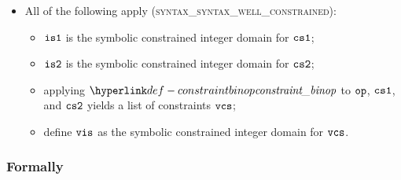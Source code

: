 \begin{itemize}
  \item All of the following apply (\textsc{syntax\_syntax\_well\_constrained}):
  \begin{itemize}
    \item $\visone$ is the symbolic constrained integer domain for $\csone$;
    \item $\vistwo$ is the symbolic constrained integer domain for $\cstwo$;
    \item applying $\constraintbinop$ to $\op$, $\csone$, and $\cstwo$ yields
          a list of constraints $\vcs$;
    \item define $\vis$ as the symbolic constrained integer domain for $\vcs$.
  \end{itemize}
\end{itemize}

\subsubsection{Formally}

\begin{mathpar}
\end{mathpar}

\begin{mathpar}
\end{mathpar}

\begin{mathpar}
\end{mathpar}

